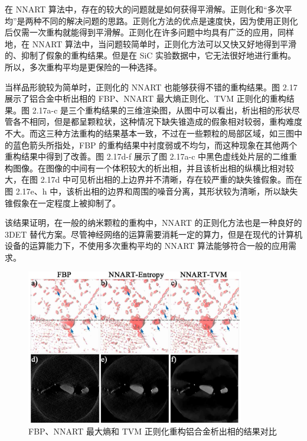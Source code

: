 在 NNART 算法中，存在的较大的问题就是如何获得平滑解。正则化和“多次平均”是两种不同的解决问题的思路。正则化方法的优点是速度快，因为使用正则化后仅需一次重构就能得到平滑解。正则化在许多问题中均具有广泛的应用，同样地，在 NNART 算法中，当问题较简单时，正则化方法可以又快又好地得到平滑的、抑制了假象的重构结果。但是在 SiC 实验数据中，它无法很好地进行重构。所以，多次重构平均是更保险的一种选择。



当样品形貌较为简单时，正则化的 NNART 也能够获得不错的重构结果。图 2.17 展示了铝合金中析出相的 FBP、NNART 最大熵正则化、TVM 正则化的重构结果。图 2.17a-c 是三个重构结果的三维渲染图，从图中可以看出，析出相的形状尽管各不相同，但是都呈颗粒状，这种情况下缺失锥造成的假象相对较弱，重构难度不大。而这三种方法重构的结果基本一致，不过在一些颗粒的局部区域，如三图中的蓝色箭头所指处，FBP 的重构结果中衬度弱或不均匀，而这种现象在其他两个重构结果中得到了改善。图 2.17d-f 展示了图 2.17a-c 中黑色虚线处片层的二维重构图像。在图像的中间有一个体积较大的析出相，并且该析出相的纵横比相对较大，在图 2.17d 中可见析出相的上边界并不清晰，存在较严重的缺失锥假象。而在图 2.17e、h 中，该析出相的边界和周围的噪音分离，其形状较为清晰，所以缺失锥假象在一定程度上被抑制了。



该结果证明，在一般的纳米颗粒的重构中，NNART 的正则化方法也是一种良好的 3DET 替代方案。尽管神经网络的运算需要消耗一定的算力，但是在现代的计算机设备的运算能力下，不使用多次重构平均的 NNART 算法能够符合一般的应用需求。

\begin{figure}[htbp]
	\vspace{\baselineskip}
	\centering
	\includegraphics[width=0.85\textwidth]{../3.12/312}
	\caption{FBP、NNART 最大熵和 TVM 正则化重构铝合金析出相的结果对比}\label{fig:312}
	\song{}
\end{figure}

